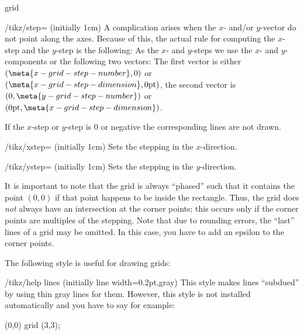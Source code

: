 \begin{pathoperation}{grid}{}
\begin{key}{/tikz/step=
    (initially 1cm)}
  A complication arises when the $x$- and/or $y$-vector do not point
  along the axes. Because of this, the actual rule for computing the
  $x$-step and the $y$-step is the following: As the $x$- and
  $y$-steps we use the $x$- and $y$-components or the following two
  vectors: The first vector is either $(\meta{x-grid-step-number},0)$
  or $(\meta{x-grid-step-dimension},0\mathrm{pt})$, the second vector
  is  $(0,\meta{y-grid-step-number})$ or
  $(0\mathrm{pt},\meta{x-grid-step-dimension})$.

  If the $x$-step or $y$-step is $0$ or negative the corresponding 
  lines are not drawn.

\end{key}

\begin{key}{/tikz/xstep= (initially 1cm)}
  Sets the stepping in the $x$-direction.
\begin{codeexample}[]
\end{codeexample}
\end{key}

\begin{key}{/tikz/ystep= (initially 1cm)}
  Sets the stepping in the $y$-direction.
\end{key}

  It is important to note that the grid is always ``phased'' such that
  it contains the point $(0,0)$ if that point happens to be inside the
  rectangle. Thus, the grid does \emph{not} always have an intersection
  at the corner points; this occurs only if the corner points are
  multiples of the stepping. Note that due to rounding errors, the
  ``last'' lines of a grid may be omitted. In this case, you have to
  add an epsilon to the corner points.

  The following style is useful for drawing grids:
\begin{stylekey}{/tikz/help lines (initially {line width=0.2pt,gray})}
  This style makes lines ``subdued'' by using thin gray lines for
  them. However, this style is not installed automatically and you
  have to say for example:
\begin{codeexample}[]
\tikz {} (0,0) grid (3,3);
\end{codeexample}
\end{stylekey}

\end{pathoperation}




